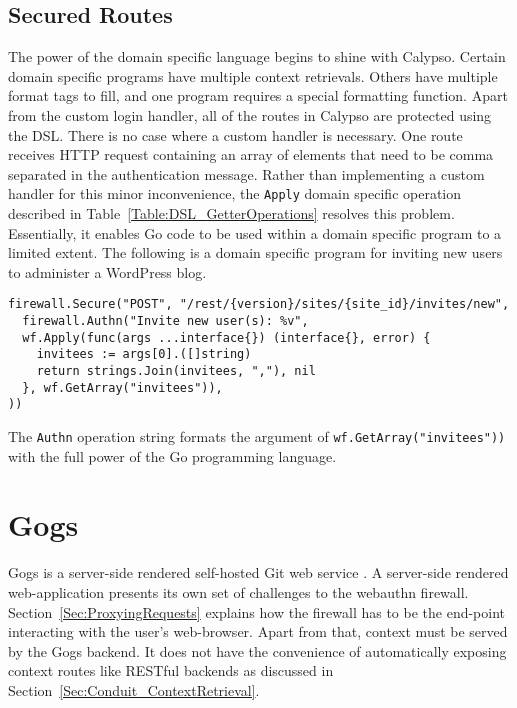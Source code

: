 \subsection{Secured Routes}\label{Sec:CalypsoSecuredRoutes}

The power of the domain specific language begins to shine with Calypso. Certain domain specific programs have multiple context retrievals. Others have multiple format tags to fill, and one program requires a special formatting function. Apart from the custom login handler, all of the routes in Calypso are protected using the DSL. There is no case where a custom handler is necessary. One route receives HTTP request containing an array of elements that need to be comma separated in the authentication message. Rather than implementing a custom handler for this minor inconvenience, the \lstinline{Apply} domain specific operation described in Table~\ref{Table:DSL_GetterOperations} resolves this problem. Essentially, it enables Go code to be used within a domain specific program to a limited extent. The following is a domain specific program for inviting new users to administer a WordPress blog.

\begin{lstlisting}[float=h]
firewall.Secure("POST", "/rest/{version}/sites/{site_id}/invites/new", 
  firewall.Authn("Invite new user(s): %v",
  wf.Apply(func(args ...interface{}) (interface{}, error) {
    invitees := args[0].([]string)
    return strings.Join(invitees, ","), nil
  }, wf.GetArray("invitees")),
))
\end{lstlisting}

The \lstinline{Authn} operation string formats the argument of \lstinline{wf.GetArray("invitees"))} with the full power of the Go programming language.

\section{Gogs}

Gogs is a server-side rendered self-hosted Git web service \cite{TODO-gogs}. A server-side rendered web-application presents its own set of challenges to the webauthn firewall. Section~\ref{Sec:ProxyingRequests} explains how the firewall has to be the end-point interacting with the user's web-browser. Apart from that, context must be served by the Gogs backend. It does not have the convenience of automatically exposing context routes like RESTful backends as discussed in Section~\ref{Sec:Conduit_ContextRetrieval}.

